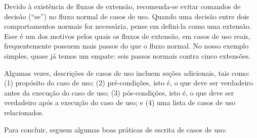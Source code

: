 \documentclass[
  11pt,
  twoside]{book}
\begin{document}
Devido à existência de fluxos de extensão, recomenda-se evitar comandos
de decisão (``se'') no fluxo normal de casos de uso. Quando uma decisão
entre dois comportamentos normais for necessária, pense em defini-la
como uma extensão. Esse é um dos motivos pelos quais os fluxos de
extensão, em casos de uso reais, frequentemente possuem mais passos do
que o fluxo normal. No nosso exemplo simples, quase já temos um empate:
seis passos normais contra cinco extensões.

Algumas vezes, descrições de casos de uso incluem seções adicionais,
tais como: (1) propósito do caso de uso; (2) pré-condições, isto é, o
que deve ser verdadeiro antes da execução do caso de uso; (3)
pós-condições, isto é, o que deve ser verdadeiro após a execução do caso
de uso; e (4) uma lista de casos de uso relacionados.

Para concluir, seguem algumas boas práticas de escrita de casos de uso:
\end{document}
